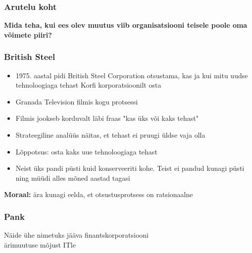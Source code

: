 \begin{frame}[fragile]
  \frametitle{Arutelu koht}
		\begin{center}
			\textbf{Mida teha, kui ees olev muutus viib organisatsiooni teisele poole oma võimete piiri?}
		\end{center}
\end{frame}

\begin{frame}[fragile]
  \frametitle{British Steel}
	\begin{itemize}
		\item 1975. aastal pidi British Steel Corporation otsustama, kas ja kui mitu uudse tehnoloogiaga tehast Korfi korporatsioonilt osta 
		\item Granada Television filmis kogu protsessi
		\item Filmis jookseb korduvalt läbi fraas "kas üks või kaks tehast"
		\item Strateegiline analüüs näitas, et tehast ei pruugi üldse vaja olla
		\item Lõppotsus: osta kaks uue tehnoloogiaga tehast
		\item Neist üks pandi püsti kuid konserveeriti kohe. Teist ei pandud kunagi püsti ning müüdi alles mõned aastad tagasi
	\end{itemize}
	\begin{center}
		\textbf{Moraal:} ära kunagi eelda, et otsustusprotsess on ratsionaalne
	\end{center}
\end{frame}

\begin{frame}[fragile]
	\frametitle{Pank}
	\vfill
	\begin{center}
		Näide ühe nimetuks jääva finantskorporatsiooni\\ ärimuutuse mõjust ITle
	\end{center}
	\vfill
\end{frame}

